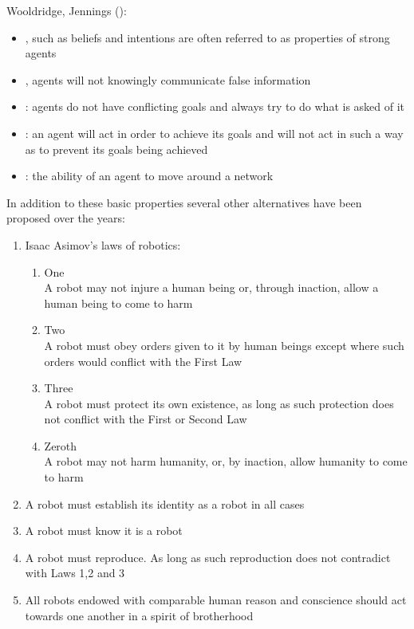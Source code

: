 Wooldridge, Jennings ():\\
\begin{itemize}
\item {}, such as beliefs and intentions are often referred to as properties of strong agents
\item {}, agents will not knowingly communicate false information
\item {}: agents do not have conflicting goals and always try to do what is asked of it
\item {}: an agent will act in order to achieve its goals and will not act in such a way as to prevent its goals being achieved
\item {}: the ability of an agent to move around a network
\end{itemize}

In addition to these basic properties several other alternatives have been proposed over the years:
\begin{enumerate}
\item Isaac Asimov's laws of robotics:
\begin{enumerate}[label={Law}]
\item One\\
A robot may not injure a human being or, through inaction, allow a human being to come to harm
\item Two\\
A robot must obey orders given to it by human beings except where such orders would conflict with the First Law
\item Three\\
A robot must protect its own existence, as long as such protection does not conflict with the First or Second Law
\item Zeroth\\
A robot may not harm humanity, or, by inaction, allow humanity to come to harm
\end{enumerate}
\item A robot must establish its identity as a robot in all cases
\item A robot must know it is a robot
\item A robot must reproduce. As long as such reproduction does not contradict with Laws 1,2 and 3
\item All robots endowed with comparable human reason and conscience should act towards one another in a spirit of brotherhood
\end{enumerate}

